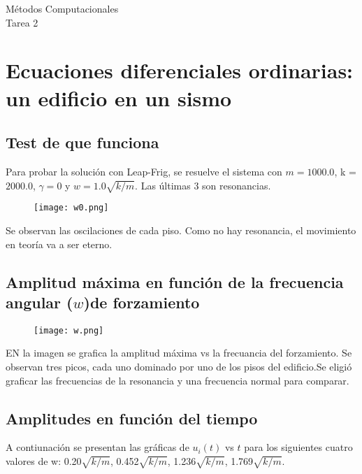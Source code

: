 \documentclass[11pt]{report}
\begin{document}
\begin{center}
{\Large M\'etodos Computacionales} \\
{Tarea 2}
\end{center}


\newpage
\section{Ecuaciones diferenciales ordinarias: un edificio en un sismo}

\subsection{Test de que funciona}
Para probar la solución con Leap-Frig, se resuelve el sistema con $m = 1000.0$, k = $2000.0$, $\gamma = 0$ y $w = 1.0 \sqrt{k/m}$. Las \'ultimas 3 son resonancias.


\begin{figure}[h]
\begin{center}
\texttt{[image: w0.png]}
\end{center}
\label{fig:uno}
\end{figure}

Se observan las oscilaciones de cada piso. Como no hay resonancia, el movimiento en teor\'ia va a ser eterno.
\newpage

\subsection{Amplitud m\'axima en función de la frecuencia angular ($w$)de forzamiento}
\begin{figure}[h]
\begin{center}
\texttt{[image: w.png]}
\end{center}
\label{fig:uno}
\end{figure}

EN la imagen se grafica la amplitud m\'axima vs la frecuancia del forzamiento. Se observan tres picos, cada uno dominado por uno de los pisos del edificio.Se eligi\'o graficar las frecuencias de la resonancia y una frecuencia normal para comparar.


\subsection{Amplitudes en funci\'on del tiempo}
A contiunaci\'on se presentan las gr\'aficas de $u_i(t)$ vs $t$ para los siguientes cuatro valores de w: 0.20$\sqrt{k/m}$, 0.452$\sqrt{k/m}$, 1.236$\sqrt{k/m}$, 1.769$\sqrt{k/m}$.
\newpage
\end{document}
